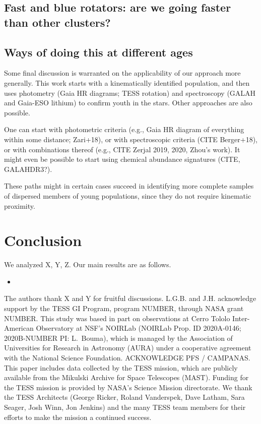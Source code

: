 \documentclass[12pt,twocolumn,tighten]{aastex63}
\begin{document}
\subsection{Fast and blue rotators: are we going faster than other clusters?}

\subsection{Ways of doing this at different ages}
Some final discussion is warranted on the applicability of our
approach more generally.  This work starts with a kinematically
identified population, and then uses photometry (Gaia HR diagrams;
TESS rotation) and spectroscopy (GALAH and Gaia-ESO lithium) to
confirm youth in the stars.  Other approaches are also possible.

One can start with photometric criteria (e.g., Gaia HR diagram of
everything within some distance; Zari+18), or with spectroscopic
criteria (CITE Berger+18), or with combinations thereof (e.g., CITE
Zerjal 2019, 2020, Zhou's work).  
It might even be possible to start using chemical abundance signatures
(CITE, GALAHDR3?).

These paths might in certain cases succeed in identifying more
complete samples of dispersed members of young populations, since they
do not require kinematic proximity.




\section{Conclusion}
\label{sec:conclusion}

We analyzed X, Y, Z.
Our main results are as follows.
\begin{itemize}
	\item 
\end{itemize}




\acknowledgements
\raggedbottom

The authors thank X and Y for fruitful discussions.
%
L.G.B. and J.H. acknowledge support by the TESS GI Program, program
NUMBER, through NASA grant NUMBER.
%
This study was based in part on observations at Cerro Tololo
Inter-American Observatory at NSF's NOIRLab (NOIRLab Prop. ID
2020A-0146; 2020B-NUMBER PI: L{.}~Bouma), which is managed by the
Association of Universities for Research in Astronomy (AURA) under a
cooperative agreement with the National Science Foundation.
%
ACKNOWLEDGE PFS / CAMPANAS.
%
This paper includes data collected by the TESS mission, which are
publicly available from the Mikulski Archive for Space Telescopes
(MAST).
%
Funding for the TESS mission is provided by NASA's Science Mission
directorate.
%
We thank the TESS Architects (George Ricker, Roland Vanderspek, Dave
Latham, Sara Seager, Josh Winn, Jon Jenkins) and the many TESS team
members for their efforts to make the mission a continued success.
%
\end{document}
